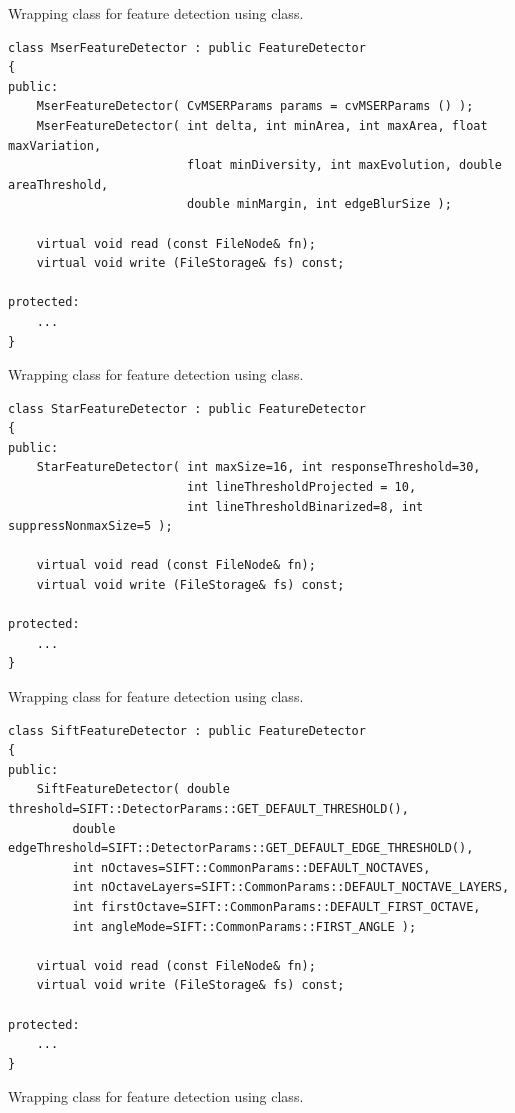 Wrapping class for feature detection using  class.

\begin{lstlisting}
class MserFeatureDetector : public FeatureDetector
{
public:
    MserFeatureDetector( CvMSERParams params = cvMSERParams () );
    MserFeatureDetector( int delta, int minArea, int maxArea, float maxVariation,
                         float minDiversity, int maxEvolution, double areaThreshold,
                         double minMargin, int edgeBlurSize );
                         
    virtual void read (const FileNode& fn);
    virtual void write (FileStorage& fs) const;
    
protected:
	...
}
\end{lstlisting}

Wrapping class for feature detection using  class.

\begin{lstlisting}
class StarFeatureDetector : public FeatureDetector
{
public:
    StarFeatureDetector( int maxSize=16, int responseThreshold=30, 
				         int lineThresholdProjected = 10,
                         int lineThresholdBinarized=8, int suppressNonmaxSize=5 );
    
    virtual void read (const FileNode& fn);
    virtual void write (FileStorage& fs) const;
    
protected:
	...
}
\end{lstlisting}

Wrapping class for feature detection using  class.

\begin{lstlisting}
class SiftFeatureDetector : public FeatureDetector
{
public:
    SiftFeatureDetector( double threshold=SIFT::DetectorParams::GET_DEFAULT_THRESHOLD(),
		 double edgeThreshold=SIFT::DetectorParams::GET_DEFAULT_EDGE_THRESHOLD(),
		 int nOctaves=SIFT::CommonParams::DEFAULT_NOCTAVES,
		 int nOctaveLayers=SIFT::CommonParams::DEFAULT_NOCTAVE_LAYERS,
		 int firstOctave=SIFT::CommonParams::DEFAULT_FIRST_OCTAVE,
		 int angleMode=SIFT::CommonParams::FIRST_ANGLE );
    
    virtual void read (const FileNode& fn);
    virtual void write (FileStorage& fs) const;
    
protected:
	...
}
\end{lstlisting}

Wrapping class for feature detection using  class.

